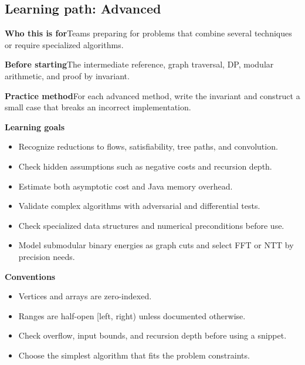 \documentclass[10pt,letterpaper]{article}
\newcommand{\entrylabel}[1]{\textcolor{accent}{\bfseries #1}}
\begin{document}
\subsection*{Learning path: Advanced}
\begin{guidebox}\entrylabel{Who this is for}\quad Teams preparing for problems that combine several techniques or require specialized algorithms.\par
\entrylabel{Before starting}\quad The intermediate reference, graph traversal, DP, modular arithmetic, and proof by invariant.\par
\entrylabel{Practice method}\quad For each advanced method, write the invariant and construct a small case that breaks an incorrect implementation.\end{guidebox}
\textbf{Learning goals}\begin{itemize}
\item Recognize reductions to flows, satisfiability, tree paths, and convolution.
\item Check hidden assumptions such as negative costs and recursion depth.
\item Estimate both asymptotic cost and Java memory overhead.
\item Validate complex algorithms with adversarial and differential tests.
\item Check specialized data structures and numerical preconditions before use.
\item Model submodular binary energies as graph cuts and select FFT or NTT by precision needs.
\end{itemize}
\begin{guidebox}\textbf{Conventions}\begin{itemize}
\item Vertices and arrays are zero-indexed.
\item Ranges are half-open [left, right) unless documented otherwise.
\item Check overflow, input bounds, and recursion depth before using a snippet.
\item Choose the simplest algorithm that fits the problem constraints.
\end{itemize}\end{guidebox}
\end{document}
